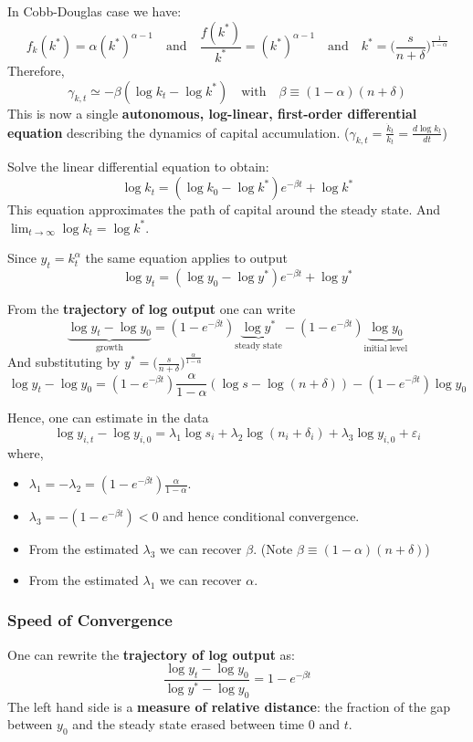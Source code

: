 In Cobb-Douglas case we have: \[
    f_k(k^*) = \alpha(k^*)^{\alpha-1} \quad\text{and}\quad \frac{f(k^*)}{k^*} = (k^*)^{\alpha-1} \quad\text{and}\quad k^* = \Big(\frac{s}{n+\delta}\Big)^{\frac{1}{1-\alpha}}
\]
Therefore, \[
    \gamma_{k,t} \simeq -\beta(\log k_t - \log k^*) \quad\text{with}\quad \beta \equiv (1-\alpha)(n+\delta)
\]
This is now a single \textbf{autonomous, log-linear, first-order differential equation} describing the dynamics of capital accumulation. ($\gamma_{k,t} = \frac{\dot{k}_t}{k_t} = \frac{d \log k_t}{dt}$)

Solve the linear differential equation to obtain: \[
    \log k_t = (\log k_0 - \log k^*)e^{-\beta t} + \log k^*
\]
This equation approximates the path of capital around the steady state. And $\lim_{t \to \infty} \log k_t = \log k^*$.

Since $y_t = k_t^{\alpha}$ the same equation applies to output \[
    \log y_t = (\log y_0 - \log y^*)e^{-\beta t}+\log y^*
\]

From the \textbf{trajectory of log output} one can write \[
    \underbrace{\log y_t - \log y_0}_{\text{growth}} = (1-e^{-\beta t}) \underbrace{\log y^*}_{\text{steady state}} - (1-e^{-\beta t})\underbrace{\log y_0}_{\text{initial level}}
\]
And substituting by $y^* = \Big(\frac{s}{n+\delta}\Big)^{\frac{\alpha}{1-\alpha}}$ \[
    \log y_t - \log y_0 = (1-e^{-\beta t})\frac{\alpha}{1-\alpha}(\log s - \log(n+\delta)) - (1-e^{-\beta t})\log y_0
\]

Hence, one can estimate in the data \[
    \log y_{i,t} - \log y_{i,0} = \lambda_1 \log s_i + \lambda_2 \log(n_i+\delta_i)+\lambda_3 \log y_{i,0} + \varepsilon_i
\]
where, \begin{itemize}
    \item $\lambda_1 = -\lambda_2 = (1-e^{-\beta t})\frac{\alpha}{1-\alpha}$.
    \item $\lambda_3 =  - (1-e^{-\beta t}) < 0$ and hence conditional convergence.
    \item From the estimated $\lambda_3$ we can recover $\beta$. (Note $\beta\equiv(1-\alpha)(n+\delta)$)
    \item From the estimated $\lambda_1$ we can recover $\alpha$.
\end{itemize}

\subsubsection{Speed of Convergence}
One can rewrite the \textbf{trajectory of log output} as: \[
    \frac{\log y_t - \log y_0}{\log y^*-\log y_0} = 1-e^{-\beta t}
\] The left hand side is a \textbf{measure of relative distance}: the fraction of the gap between $y_0$ and the steady state erased between time $0$ and $t$.


